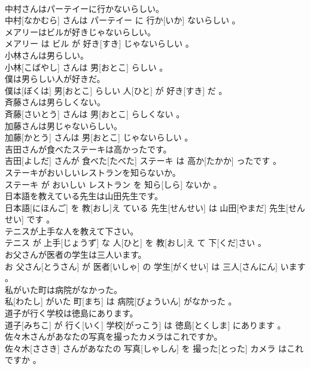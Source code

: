 \documentclass[8pt]{extreport}
\begin{document}
\begin{CJK}{UTF8}{min}
\\	中村さんはパーテイーに行かないらしい。	
\\	中村[なかむら] さんは パーテイー に 行か[いか] ないらしい 。
\\	メアリーはビルが好きじゃないらしい。	
\\	メアリー は ビル が 好き[すき] じゃないらしい 。
\\	小林さんは男らしい。	
\\	小林[こばやし] さんは 男[おとこ] らしい 。
\\	僕は男らしい人が好きだ。	
\\	僕は[ぼくは] 男[おとこ] らしい 人[ひと] が 好き[すき] だ 。
\\	斉藤さんは男らしくない。	
\\	斉藤[さいとう] さんは 男[おとこ] らしくない 。
\\	加藤さんは男じゃないらしい。	
\\	加藤[かとう] さんは 男[おとこ] じゃないらしい 。
\\	吉田さんが食べたステーキは高かったです。	
\\	吉田[よしだ] さんが 食べた[たべた] ステーキ は 高か[たかか] ったです 。
\\	ステーキがおいしいレストランを知らないか。	
\\	ステーキ が おいしい レストラン を 知ら[しら] ないか 。
\\	日本語を教えている先生は山田先生です。	
\\	日本語[にほんご] を 教[おし]え ている 先生[せんせい] は 山田[やまだ] 先生[せんせい] です 。
\\	テニスが上手な人を教えて下さい。	
\\	テニス が 上手[じょうず] な 人[ひと] を 教[おし]え て 下[くだ]さい 。
\\	お父さんが医者の学生は三人います。	
\\	お 父さん[とうさん] が 医者[いしゃ] の 学生[がくせい] は 三人[さんにん] います 。
\\	私がいた町は病院がなかった。	
\\	私[わたし] がいた 町[まち] は 病院[びょういん] がなかった 。
\\	道子が行く学校は徳島にあります。	
\\	道子[みちこ] が 行く[いく] 学校[がっこう] は 徳島[とくしま] にあります 。
\\	佐々木さんがあなたの写真を撮ったカメラはこれですか。	
\\	佐々木[ささき] さんがあなたの 写真[しゃしん] を 撮った[とった] カメラ はこれですか 。

\end{CJK}
\end{document}
